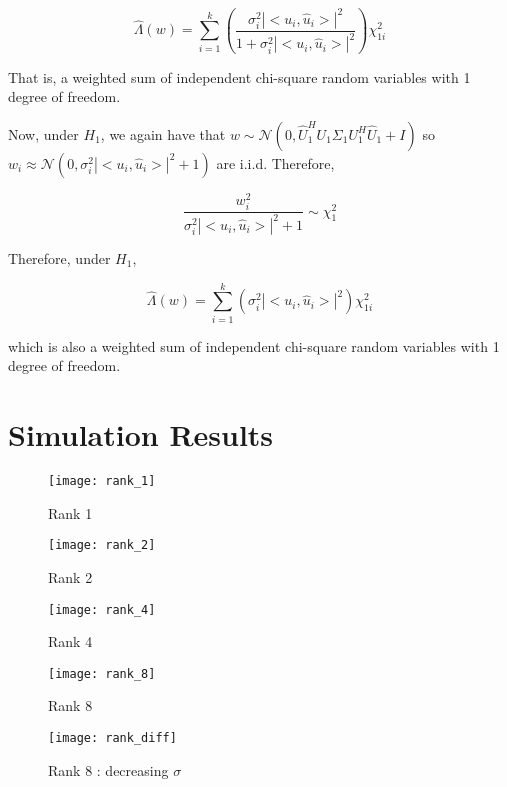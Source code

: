 \documentclass[english]{article}
\begin{document}
\begin{equation}
\hat{\Lambda}(w)=\sum_{i=1}^k\left(\frac{\sigma_i^2|<u_i,\hat{u}_i>|^2}{1+\sigma_i^2|<u_i,\hat{u}_i>|^2}\right)\chi^2_{1i}
\end{equation}

That is, a weighted sum of independent chi-square random variables with 1 degree of freedom.

Now, under $H_1$, we again have that $w\sim\mathcal{N}(0,\hat{U}^H_1U_1\Sigma_1U_1^H\hat{U}_1+I)$ so $w_i\approx\mathcal{N}(0,\sigma^2_i|<u_i,\hat{u}_i>|^2+1)$ are i.i.d.  Therefore,

\begin{equation}
\frac{w_i^2}{\sigma^2_i|<u_i,\hat{u}_i>|^2+1}\sim\chi_1^2
\end{equation}

Therefore, under $H_1$,

\begin{equation}
\hat{\Lambda}(w)=\sum_{i=1}^k\left(\sigma^2_i|<u_i,\hat{u}_i>|^2\right)\chi^2_{1i}
\end{equation}

which is also a weighted sum of independent chi-square random variables with 1 degree of freedom.

\section*{Simulation Results}

\begin{figure}[h!]
\centering
\texttt{[image: rank\_1]}
\caption{Rank 1}
\end{figure}

\begin{figure}[h!]
\centering
\texttt{[image: rank\_2]}
\caption{Rank 2}
\end{figure}

\begin{figure}[h!]
\centering
\texttt{[image: rank\_4]}
\caption{Rank 4}
\end{figure}

\begin{figure}[h!]
\centering
\texttt{[image: rank\_8]}
\caption{Rank 8}
\end{figure}

\begin{figure}[h!]
\centering
\texttt{[image: rank\_diff]}
\caption{Rank 8 : decreasing $\sigma$}
\end{figure}
\end{document}
